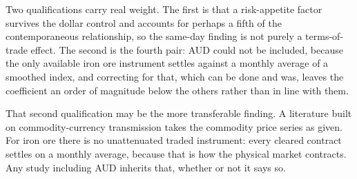 \documentclass[11pt,a4paper]{article}
\begin{document}
Two qualifications carry real weight. The first is that a risk-appetite factor
survives the dollar control and accounts for perhaps a fifth of the
contemporaneous relationship, so the same-day finding is not purely a
terms-of-trade effect. The second is the fourth pair: AUD could not be included,
because the only available iron ore instrument settles against a monthly average
of a smoothed index, and correcting for that, which can be done and was, leaves
the coefficient an order of magnitude below the others rather than in line with
them.

That second qualification may be the more transferable finding. A literature
built on commodity-currency transmission takes the commodity price series as
given. For iron ore there is no unattenuated traded instrument: every cleared
contract settles on a monthly average, because that is how the physical market
contracts. Any study including AUD inherits that, whether or not it says so.
\end{document}
